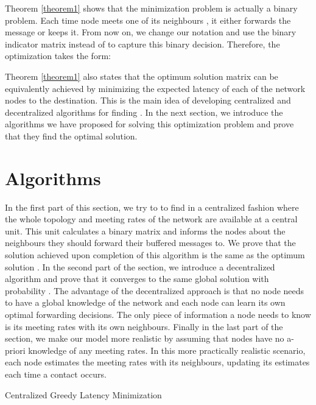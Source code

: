 \documentclass[journal,onecolumn,11pt]{IEEEtran}
\theoremstyle{plain}
\theoremstyle{definition}
\begin{document}
Theorem \ref{theorem1} shows that the minimization problem is actually a binary problem. Each time node  meets one of its neighbours , it either forwards the message or keeps it. From now on, we change our notation and use the binary indicator matrix  instead of  to capture this binary decision. Therefore, the optimization takes the form:

Theorem \ref{theorem1} also states that the optimum solution matrix  can be equivalently achieved by minimizing the expected latency of each of the network nodes to the destination. This is the main idea of developing centralized and decentralized algorithms for finding . In the next section, we introduce the algorithms we have proposed for solving this optimization problem and prove that they find the optimal solution.


\section{Algorithms}\label{sec:algo}

In the first part of this section, we try to to find  in
a centralized fashion where the whole topology and meeting rates of
the network are available at a central unit. This unit calculates a
binary matrix  and informs the nodes about the neighbours
they should forward their buffered messages to. We prove that the
solution achieved upon completion of this algorithm is the same as the
optimum solution . In the second part of the section,
we introduce a decentralized algorithm and prove that it converges to
the same global solution with
probability . The advantage of the decentralized approach is that
no node needs to have a global knowledge of the network and each node
can learn its own optimal forwarding decisions. The only piece of
information a node needs to know is its meeting rates with its own
neighbours. Finally in the last part of the section, we make our
model more realistic by assuming that nodes have no a-priori knowledge
of any meeting rates. In this more practically realistic scenario,
each node estimates the meeting rates with its neighbours, updating
its estimates each time a contact occurs.

\begin{algorithm}[!htb]
\caption{Centralized Greedy Latency Minimization} \label{algo:cen}
\begin{spacing}{1.0}
\begin{algorithmic}[1]
		\vspace{3mm}
 		\WHILE{}

				\vspace{0.15cm}
			\ENDFOR
		\ENDWHILE

\end{algorithmic}
\end{spacing}
\end{algorithm}
\end{document}
